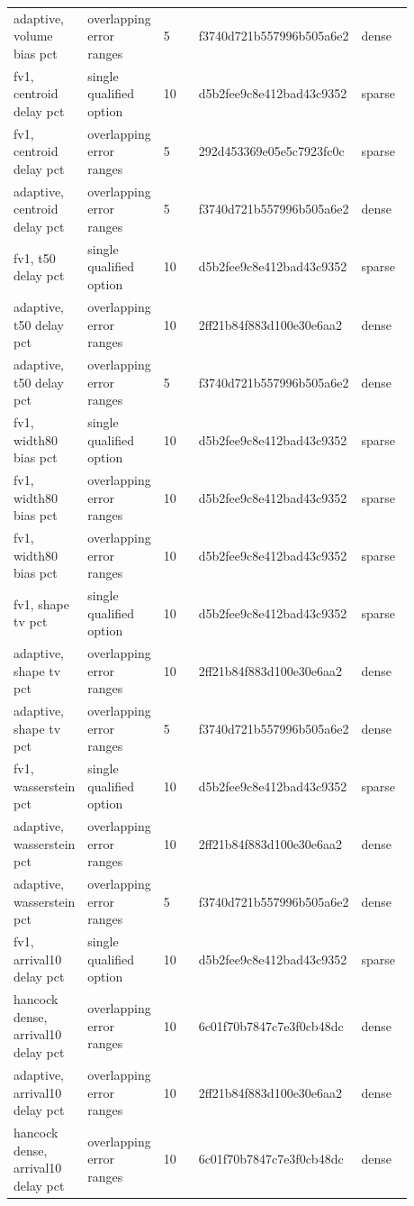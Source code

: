 \begin{longtable}{p{0.1760\linewidth}p{0.1760\linewidth}p{0.1760\linewidth}p{0.1760\linewidth}p{0.1760\linewidth}}
adaptive, volume bias pct & overlapping error ranges & 5 & f3740d721b557996b505a6e2 & dense \\
fv1, centroid delay pct & single qualified option & 10 & d5b2fee9c8e412bad43c9352 & sparse \\
fv1, centroid delay pct & overlapping error ranges & 5 & 292d453369e05e5c7923fc0c & sparse \\
adaptive, centroid delay pct & overlapping error ranges & 5 & f3740d721b557996b505a6e2 & dense \\
fv1, t50 delay pct & single qualified option & 10 & d5b2fee9c8e412bad43c9352 & sparse \\
adaptive, t50 delay pct & overlapping error ranges & 10 & 2ff21b84f883d100e30e6aa2 & dense \\
adaptive, t50 delay pct & overlapping error ranges & 5 & f3740d721b557996b505a6e2 & dense \\
fv1, width80 bias pct & single qualified option & 10 & d5b2fee9c8e412bad43c9352 & sparse \\
fv1, width80 bias pct & overlapping error ranges & 10 & d5b2fee9c8e412bad43c9352 & sparse \\
fv1, width80 bias pct & overlapping error ranges & 10 & d5b2fee9c8e412bad43c9352 & sparse \\
fv1, shape tv pct & single qualified option & 10 & d5b2fee9c8e412bad43c9352 & sparse \\
adaptive, shape tv pct & overlapping error ranges & 10 & 2ff21b84f883d100e30e6aa2 & dense \\
adaptive, shape tv pct & overlapping error ranges & 5 & f3740d721b557996b505a6e2 & dense \\
fv1, wasserstein pct & single qualified option & 10 & d5b2fee9c8e412bad43c9352 & sparse \\
adaptive, wasserstein pct & overlapping error ranges & 10 & 2ff21b84f883d100e30e6aa2 & dense \\
adaptive, wasserstein pct & overlapping error ranges & 5 & f3740d721b557996b505a6e2 & dense \\
fv1, arrival10 delay pct & single qualified option & 10 & d5b2fee9c8e412bad43c9352 & sparse \\
hancock dense, arrival10 delay pct & overlapping error ranges & 10 & 6c01f70b7847c7e3f0cb48dc & dense \\
adaptive, arrival10 delay pct & overlapping error ranges & 10 & 2ff21b84f883d100e30e6aa2 & dense \\
hancock dense, arrival10 delay pct & overlapping error ranges & 10 & 6c01f70b7847c7e3f0cb48dc & dense \\

\end{longtable}
